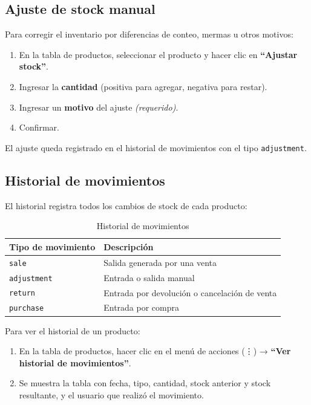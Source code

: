 \subsection{Ajuste de stock manual}\label{ajuste-de-stock-manual}

Para corregir el inventario por diferencias de conteo, mermas u otros motivos:

\begin{enumerate}
\def\labelenumi{\arabic{enumi}.}
\tightlist
\item
  En la tabla de productos, seleccionar el producto y hacer clic en \textbf{``Ajustar stock''}.
\item
  Ingresar la \textbf{cantidad} (positiva para agregar, negativa para restar).
\item
  Ingresar un \textbf{motivo} del ajuste \emph{(requerido)}.
\item
  Confirmar.
\end{enumerate}

El ajuste queda registrado en el historial de movimientos con el tipo \texttt{adjustment}.

\subsection{Historial de movimientos}\label{historial-de-movimientos}

El historial registra todos los cambios de stock de cada producto:

\begin{longtable}[]{@{}ll@{}}
\caption[Historial de movimientos]{Historial de movimientos}\tabularnewline
\toprule\noalign{}
Tipo de movimiento & Descripción \\
\midrule\noalign{}
\endhead
\bottomrule\noalign{}
\endlastfoot
\texttt{sale} & Salida generada por una venta \\
\texttt{adjustment} & Entrada o salida manual \\
\texttt{return} & Entrada por devolución o cancelación de venta \\
\texttt{purchase} & Entrada por compra \\
\end{longtable}

Para ver el historial de un producto:

\begin{enumerate}
\def\labelenumi{\arabic{enumi}.}
\tightlist
\item
  En la tabla de productos, hacer clic en el menú de acciones (⋮) → \textbf{``Ver historial de movimientos''}.
\item
  Se muestra la tabla con fecha, tipo, cantidad, stock anterior y stock resultante, y el usuario que realizó el movimiento.
\end{enumerate}

